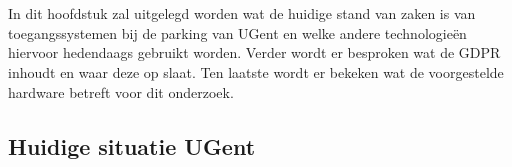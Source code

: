 \chapter{}
\label{ch:stand-van-zaken}






In dit hoofdstuk zal uitgelegd worden wat de huidige stand van zaken is van toegangssystemen bij de parking van UGent en welke andere technologieën hiervoor hedendaags gebruikt worden.
Verder wordt er besproken wat de GDPR inhoudt en waar deze op slaat. Ten laatste wordt er bekeken wat de voorgestelde hardware betreft voor dit onderzoek.

\section{Huidige situatie UGent}

